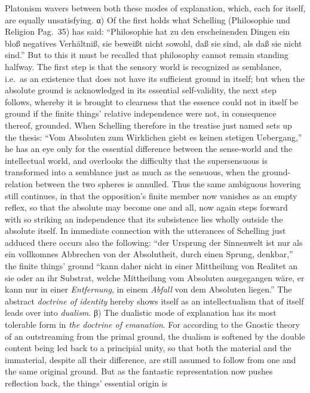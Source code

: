 \documentclass[12pt]{book}
\begin{document}
Platonism wavers between both these modes of explanation, which, each for
itself, are equally unsatisfying. α) Of the first holds what Schelling
(Philosophie und Religion Pag.\ 35) has said: ``Philosophie hat zu den
erscheinenden Dingen ein bloß negatives Verhältniß, sie beweißt nicht
sowohl, daß sie sind, als daß sie nicht sind.'' But to this it must be
recalled that philosophy cannot remain standing halfway. The first step is
that the sensory world is recognized as semblance, i.e.\ as an existence
that does not have its sufficient ground in itself; but when the absolute
ground is acknowledged in its essential self-validity, the next step
follows, whereby it is brought to clearness that the essence could not in
itself be ground if the finite things' relative independence were not, in
consequence thereof, grounded. When Schelling therefore in the treatise just
named sets up the thesis: ``Vom Absoluten zum Wirklichen giebt es keinen
stetigen Uebergang,'' he has an eye only for the essential difference
between the sense-world and the intellectual world, and overlooks the
difficulty that the supersensuous is transformed into a semblance just as
much as the sensuous, when the ground-relation between the two spheres is
annulled. Thus the same ambiguous hovering still continues, in that the
opposition's finite member now vanishes as an empty reflex, so that the
absolute may become one and all, now again steps forward with so striking an
independence that its subsistence lies wholly outside the absolute itself.
In immediate connection with the utterances of Schelling just adduced there
occurs also the following: ``der Ursprung der Sinnenwelt ist nur als ein
vollkomnes Abbrechen von der Absolutheit, durch einen Sprung, denkbar,'' the
finite things' ground ``kann daher nicht in einer Mittheilung von Realitet
an sie oder an ihr Substrat, welche Mittheilung vom Absoluten ausgegangen
wäre, er kann nur in einer \emph{Entfernung}, in einem \emph{Abfall} von dem
Absoluten liegen.'' The abstract \emph{doctrine of identity} hereby shows
itself as an intellectualism that of itself leads over into
\emph{dualism}. β) The dualistic mode of explanation has its most tolerable
form in \emph{the doctrine of emanation}. For according to the Gnostic
theory of an outstreaming from the primal ground, the dualism is softened by
the double content being led back to a principial unity, so that both the
material and the immaterial, despite all their difference, are still assumed
to follow from one and the same original ground. But as the fantastic
representation now pushes reflection back, the things' essential origin is
\end{document}
